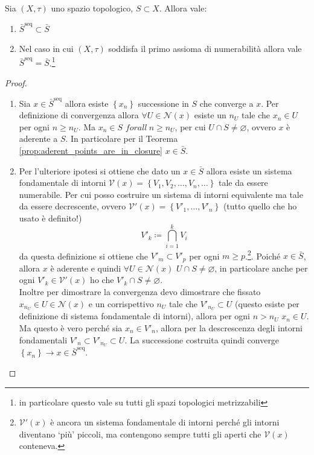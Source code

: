 \begin{theorem}
	Sia $(X,\tau)$ uno spazio topologico, $S \subset X$. Allora vale:
	\begin{enumerate}
		\item $\bar{S}^\text{seq} \subset \bar{S}$
		\item Nel caso in cui $(X, \tau)$ soddisfa il primo assioma di numerabilità allora vale $\bar{S}^\text{seq} = \bar{S}$.\footnote{in particolare questo vale su tutti gli spazi topologici metrizzabili}
	\end{enumerate}
\end{theorem}
\begin{proof} \
	\begin{enumerate}
		\item Sia $x \in \bar{S}^\text{seq}$ allora esiste $\left\{x_n\right\}$ successione in $S$ che converge a $x$. Per definizione di convergenza allora $\forall U \in \mathcal{N}(x)$ esiste un $n_U$ tale che $x_n \in U$ per ogni $n \ge n_U$. Ma $x_n \in S$ $	forall \ n \ge n_U$, per cui $U \cap S \neq \varnothing$, ovvero $x$ è aderente a $S$. In particolare per il Teorema \ref{prop:aderent_points_are_in_closure} $x \in \bar{S}$. 
		\item Per l'ulteriore ipotesi si ottiene che dato un $x \in \bar{S}$ allora esiste un sistema fondamentale di intorni $\mathcal{V}(x) = \left\{V_1, V_2, \dots, V_n, \dots\right\}$ tale da essere numerabile. Per cui posso costruire un sistema di intorni equivalente ma tale da essere decrescente, ovvero $\mathcal{V}'(x) = \left\{V'_1, \dots, V'_n\right\}$ (tutto quello che ho usato è definito!)
		\begin{equation*}
			V'_k \coloneqq \bigcap^k_{i=1} V_i
		\end{equation*}
		da questa definizione si ottiene che $V'_{m} \subset V'_p$ per ogni $m \ge p$.\footnote{$\mathcal{V}'(x)$ è ancora un sistema fondamentale di intorni perché gli intorni diventano `più' piccoli, ma contengono sempre tutti gli aperti che $\mathcal{V}(x)$ conteneva.}.
		Poiché $x \in \bar{S}$, allora $x$ è aderente e quindi $\forall U \in \mathcal{N}(x)$ $U \cap S \neq \varnothing$, in particolare anche per ogni $V'_k \in \mathcal{V}'(x)$ ho che $V'_k \cap S \neq \varnothing$. \\ Inoltre per dimostrare la convergenza devo dimostrare che fissato $x_{n_U} \in U \in \mathcal{N}(x)$ e un corrispettivo $n_U$ tale che $V'_{n_U} \subset U$ (questo esiste per definizione di sistema fondamentale di intorni), allora per ogni $n > n_U$ $x_n \in U$. Ma questo è vero perché sia $x_n \in V'_n$, allora per la descrescenza degli intorni fondamentali $V'_{n} \subset V'_{n_U} \subset U$. La successione costruita quindi converge $\left\{x_n\right\} \rightarrow x \in \bar{S}^\text{seq}$.
	\end{enumerate}
\end{proof}

